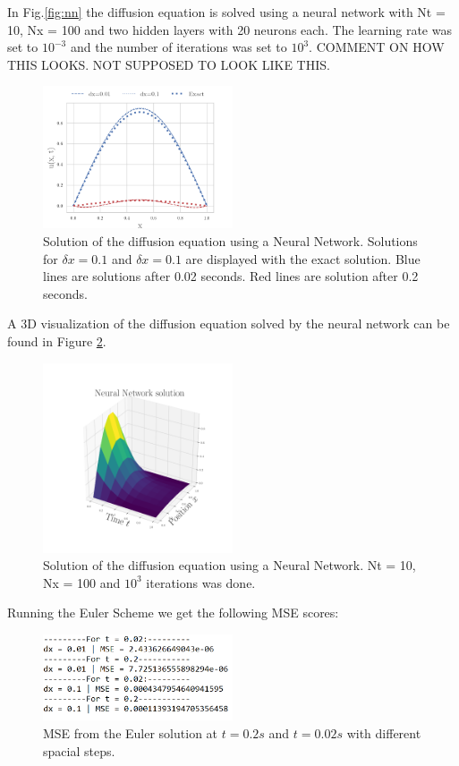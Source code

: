 \documentclass[a4paper,11pt,twocolumn]{article}
\begin{document}
In Fig.\ref{fig:nn} the diffusion equation is solved using a neural network with Nt = 10, Nx = 100 and two hidden layers with 20 neurons each. The learning rate was set to $10^{-3}$ and the number of iterations was set to $10^3$. COMMENT ON HOW THIS LOOKS. NOT SUPPOSED TO LOOK LIKE THIS.

\begin{figure}[h]
	\centering 
	\includegraphics[width=0.5\textwidth]{figures/NN}
	\caption{Solution of the diffusion equation using a Neural Network. Solutions for $\delta x = 0.1$ and $\delta x = 0.1$ are displayed with the exact solution. Blue lines are solutions after 0.02 seconds. Red lines are solution after 0.2 seconds.}
	\label{nn}
\end{figure}

A 3D visualization of the diffusion equation solved by the neural network can be found in Figure \ref{3dnn}.

\begin{figure}[h]
	\centering 
	\includegraphics[width=0.5\textwidth]{figures/dnn}
	\caption{Solution of the diffusion equation using a Neural Network. Nt = 10, Nx = 100 and $10^3$ iterations was done. }
	\label{3dnn}
\end{figure}

Running the Euler Scheme we get the following MSE scores:

\begin{figure}[h]
	\centering 
	\includegraphics[width=0.5\textwidth]{figures/euler_mse}
	\caption{MSE from the Euler solution at $t = 0.2s$ and $t = 0.02s$ with different spacial steps.}
	\label{eulermse}
\end{figure}
\end{document}

